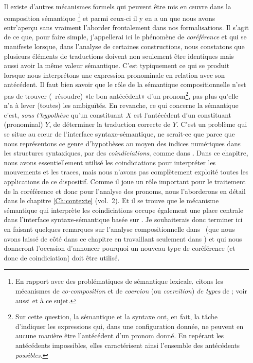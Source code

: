 Il existe d'autres mécanismes formels qui peuvent être mis en \oe uvre dans la composition sémantique%
\footnote{En rapport avec des problématiques de sémantique lexicale, citons les mécanismes de \mbox{\emph{co-composition}} et de \emph{coercion} (ou \emph{coercition}) \emph{de types} de \citet{Pust:95} ; voir aussi \citet{Asher:11} et \citet{deSwart:11x} à ce sujet.}
et parmi ceux-ci il y en a un que nous avons entr'aperçu sans vraiment l'aborder frontalement dans nos formalisations.
Il s'agit de ce que, pour faire simple, j'appellerai ici le phénomène de \emph{coréférence} et qui  se manifeste lorsque, dans l'analyse de certaines constructions, nous constatons que plusieurs éléments de traductions doivent non seulement être identiques mais aussi avoir la même valeur sémantique.  C'est typiquement ce qui se produit lorsque nous interprétons une expression pronominale en relation avec son antécédent.  
Il faut bien savoir que le rôle de la sémantique compositionnelle n'est pas de trouver (\ie\ résoudre) «le bon antécédent» d'un pronom\footnote{Sur cette question, la sémantique et la syntaxe ont, en fait, la tâche d'indiquer les expressions qui, dans une configuration donnée, ne peuvent en aucune manière être l'antécédent d'un pronom donné. En repérant les antécédents impossibles, elles caractérisent ainsi l'ensemble des antécédents \emph{possibles}. }, pas plus qu'elle n'a à lever (toutes) les ambiguïtés.  En revanche, ce qui concerne la sémantique c'est, \emph{sous l'hypothèse} qu'un constituant $X$ est l'antécédent d'un constituant (pronominal) $Y$, 
de déterminer la traduction correcte de $Y$.  
C'est un problème qui se situe au c\oe ur de l'interface syntaxe-sémantique, ne serait-ce que parce que nous représentons ce genre d'hypothèses au moyen des indices numériques dans les structures syntaxiques, par des \emph{coindiciations}, comme dans .
Dans ce chapitre, nous avons essentiellement utilisé les coindiciations pour interpréter les mouvements et les traces, mais nous n'avons pas complètement exploité toutes les applications de ce dispositif. 
Comme il joue un rôle important pour le traitement de la coréférence et donc pour l'analyse des pronoms, nous l'aborderons en détail dans le chapitre \ref{Ch:contexte} (vol.~2).
Et il se trouve que le mécanisme sémantique qui interprète les coindiciations occupe également une place centrale dans l'interface syntaxe-sémantique basée sur \LOz.  Je souhaiterais donc terminer ici en faisant quelques remarques sur l'analyse compositionnelle dans \LOz\ (que nous avons laissé de côté dans ce chapitre en travaillant seulement dans \LO) et qui nous donneront l'occasion d'annoncer pourquoi un nouveau type de coréférence (et donc de coindiciation) doit être utilisé.


